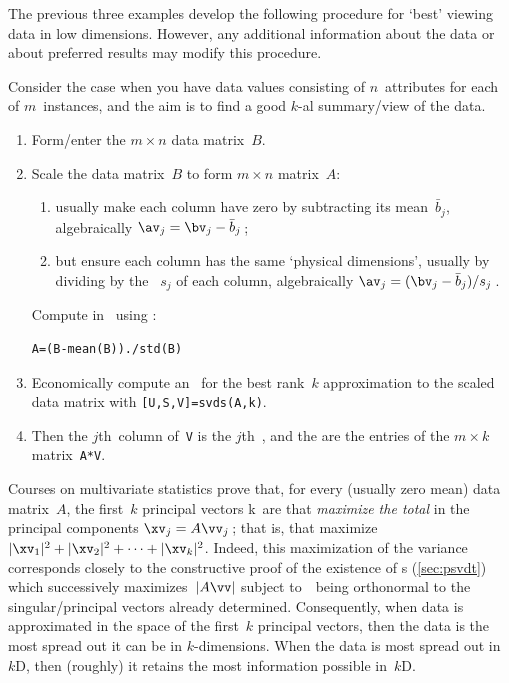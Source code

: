 The previous three examples develop the following procedure for `best' viewing data in low dimensions.
However, any additional information about the data or about preferred results may modify this procedure. 


\begin{procedure} \label{pro:pca}
Consider the case when you have data values consisting of \(n\)~attributes for each of \(m\)~instances, and the aim is to find a good \(k\)-al summary\slash view of the data. 
\begin{enumerate}
\item Form\slash enter the \(m\times n\) data matrix~\(B\).
\item {}Scale the data matrix~\(B\) to form \(m\times n\) matrix~\(A\):
\begin{enumerate}
\item usually make each column have zero  by subtracting its mean~\(\bar b_j\), algebraically \(\av_j=\bv_j-\bar b_j\)\,;
\item but ensure each column has the same `physical dimensions', usually by dividing by the ~\(s_j\) of each column, algebraically \(\av_j=(\bv_j-\bar b_j)/s_j\)\,.
\end{enumerate}
Compute in \script\ using :
\begin{verbatim}
A=(B-mean(B))./std(B)
\end{verbatim}

\item  Economically compute an \svd\ for the best rank~\(k\) approximation to the scaled data matrix with \verb|[U,S,V]=svds(A,k)|.
\item Then the \(j\)th~column of~\verb|V| is the \(j\)th~, and the  are the entries of the \(m\times k\) matrix~\verb|A*V|.
\end{enumerate}
\end{procedure}




Courses on multivariate statistics prove that, for every (usually zero mean) data matrix~\(A\), the first~\(k\) principal vectors \hlist\vv k\ are  that \emph{maximize the total } in the principal components \(\xv_j=A\vv_j\)\,; that is, that maximize \(|\xv_1|^2+|\xv_2|^2+\cdots+|\xv_k|^2\).
Indeed, this maximization of the variance corresponds closely to the constructive proof of the existence of \svd{}s (\cref{sec:psvdt}) which successively maximizes~\(|A\vv|\) subject to~\vv\ being orthonormal to the singular\slash principal vectors already determined.
Consequently, when data is approximated in the space of the first~\(k\) principal vectors, then the data is the most spread out it can be in \(k\)-dimensions.
When the data is most spread out in~\(k\)D, then (roughly) it retains the most information possible in~\(k\)D.


